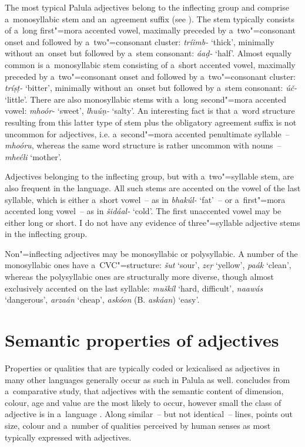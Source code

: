 The most typical Palula adjectives belong to the inflecting group and comprise a~monosyllabic stem and an~agreement suffix (see ). The stem typically consists of a~long first"=mora accented vowel, maximally preceded by a~two"=consonant onset and followed by a~two"=consonant cluster: \textit{tríimb-} `thick', minimally without an~onset but followed by a~stem consonant: \textit{áaḍ-} `half'. Almost equally common is a~monosyllabic stem consisting of a~short accented vowel, maximally preceded by a~two"=consonant onset and followed by a~two"=consonant cluster: \textit{tríṣṭ-} `bitter', minimally without an~onset but followed by a~stem consonant: \textit{úč-} `little'. There are also monosyllabic stems with a~long second"=mora accented vowel: \textit{mhoór-} `sweet', \textit{lhuúṇ-} `salty'. An interesting fact is that a~word structure resulting from this latter type of stem plus the obligatory agreement suffix is not uncommon for adjectives, i.e. a~second"=mora accented penultimate syllable~-- \textit{mhoóru}, whereas the same word structure is rather uncommon with nouns~-- \textit{mheéli} `mother'.


Adjectives belonging to the inflecting group, but with a~two"=syllable stem, are also frequent in the language. All such stems are accented on the vowel of the last syllable, which is either a~short vowel~-- as in \textit{bhakúl-} `fat'~-- or a~first"=mora accented long vowel~-- as in \textit{šidáal-} `cold'. The first unaccented vowel may be either long or short. I do not have any evidence of three"=syllable adjective stems in the inflecting group.


Non"=inflecting adjectives may be monosyllabic or polysyllabic. A number of the monosyllabic ones have a~CVC"=structure: \textit{šut} `sour', \textit{zeṛ} `yellow', \textit{paák} `clean', whereas the polysyllabic ones are structurally more diverse, though almost exclusively accented on the last syllable: \textit{muškíl} `hard, difficult', \textit{naawás} `dangerous', \textit{arzaán} `cheap', \textit{askóon} (B. \textit{askáan}) `easy'. 


\section{Semantic properties of adjectives}
\label{sec:6-2}

Properties or qualities that are typically coded or lexicalised as adjectives in many other languages generally occur as such in Palula as well. \citeauthor{dixon1982} concludes from a~comparative study, that adjectives with the semantic content of dimension, colour, age and value are the most likely to occur, however small the class of adjective is in a~language \citep[46]{dixon1982}. Along similar~-- but not identical~-- lines, \citet[82]{givon2001a} points out size, colour and a~number of qualities perceived by human senses as most typically expressed with adjectives. 



